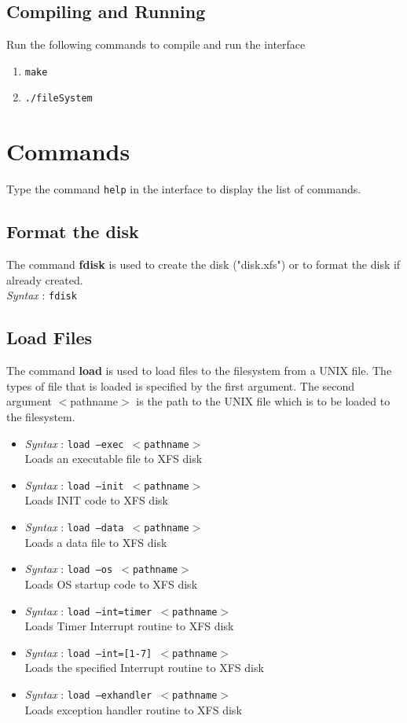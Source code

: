 \documentclass[11pt]{report}
\begin{document}
\subsection{Compiling and Running}
Run the following commands to compile and run the interface
\begin{enumerate}
		\item \texttt{make}
		\item \texttt{./fileSystem}
\end{enumerate}

\section{Commands}
Type the command \texttt{help} in the interface to display the list of commands.

 
\subsection{Format the disk}
The command \textbf{fdisk} is used to create the disk ("disk.xfs") or to format the disk if already created. \\
\textit{Syntax} : \texttt{fdisk}

\subsection{Load Files}
The command \textbf{load} is used to load files to the filesystem from a UNIX file. The types of file that is loaded is specified by the first argument. The second argument $<$pathname$>$ is the path to the UNIX file which is to be loaded to the filesystem.
\begin{itemize}
	\item \textit{Syntax} : \texttt{load --exec  $<$pathname$>$}  \\
	 Loads an executable file to XFS disk 
	\item \textit{Syntax} : \texttt{load --init  $<$pathname$>$}  \\
	 Loads INIT code to XFS disk 
	\item \textit{Syntax} : \texttt{load --data $<$pathname$>$} \\
	 Loads a data file to XFS disk 
	\item \textit{Syntax} : \texttt{load --os  $<$pathname$>$} \\
	 Loads OS startup code to XFS disk 
	\item \textit{Syntax} : \texttt{load --int=timer $<$pathname$>$}\\
	 Loads Timer Interrupt routine to XFS disk 
	\item \textit{Syntax} : \texttt{load --int=[1-7] $<$pathname$>$}\\
	 Loads the specified Interrupt routine to XFS disk 
	\item \textit{Syntax} : \texttt{load --exhandler $<$pathname$>$}  \\
	 Loads exception handler routine to XFS disk 
	 
\end{itemize}
\end{document}
